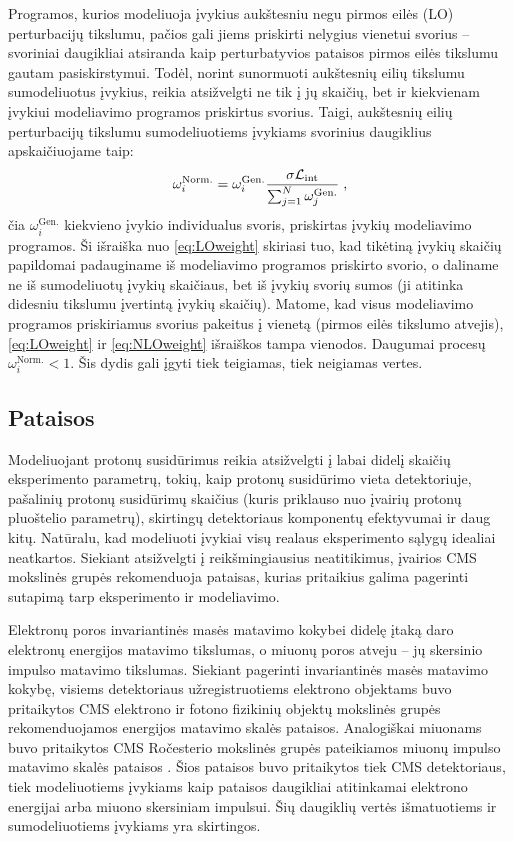 \documentclass[a4paper, 12pt, oneside]{article}
\newcommand{\Lumi}{{\cal L}_\mathrm{int}}
\newlength\q
\begin{document}
Programos, kurios modeliuoja įvykius aukštesniu negu pirmos eilės (LO) perturbacijų tikslumu, pačios gali jiems priskirti
nelygius vienetui svorius -- svoriniai daugikliai atsiranda kaip perturbatyvios pataisos pirmos eilės tikslumu gautam
pasiskirstymui.
Todėl, norint sunormuoti aukštesnių eilių tikslumu sumodeliuotus įvykius, reikia atsižvelgti ne tik į jų skaičių, bet
ir kiekvienam įvykiui modeliavimo programos priskirtus svorius.
Taigi, aukštesnių eilių perturbacijų tikslumu sumodeliuotiems įvykiams svorinius daugiklius apskaičiuojame taip:
\begin{equation}
	\omega_{i}^{\mathrm{Norm.}} = \omega_{i}^{\mathrm{Gen.}} \frac{ \sigma\Lumi }{ \sum_{j=1}^{N}\omega_{j}^{\mathrm{Gen.}} } \; ,
	\label{eq:NLOweight}
\end{equation}
čia $\omega_{i}^{\mathrm{Gen.}}$ kiekvieno įvykio individualus svoris, priskirtas įvykių modeliavimo programos.
Ši išraiška nuo \eqref{eq:LOweight} skiriasi tuo, kad tikėtiną įvykių skaičių papildomai padauginame iš modeliavimo programos
priskirto svorio, o daliname ne iš sumodeliuotų įvykių skaičiaus, bet iš įvykių svorių sumos (ji atitinka didesniu tikslumu
įvertintą įvykių skaičių).
Matome, kad visus modeliavimo programos priskiriamus svorius pakeitus į vienetą (pirmos eilės tikslumo atvejis), \eqref{eq:LOweight}
ir \eqref{eq:NLOweight} išraiškos tampa vienodos.
Daugumai procesų $\omega_{i}^{\mathrm{Norm.}}<1$.
Šis dydis gali įgyti tiek teigiamas, tiek neigiamas vertes.


\subsection{Pataisos}\label{sec:corrections}
Modeliuojant protonų susidūrimus reikia atsižvelgti į labai didelį skaičių eksperimento parametrų, tokių, kaip protonų
susidūrimo vieta detektoriuje, pašalinių protonų susidūrimų skaičius (kuris priklauso nuo įvairių protonų pluoštelio parametrų),
skirtingų detektoriaus komponentų efektyvumai ir daug kitų.
Natūralu, kad modeliuoti įvykiai visų realaus eksperimento sąlygų idealiai neatkartos.
Siekiant atsižvelgti į reikšmingiausius neatitikimus, įvairios CMS mokslinės grupės rekomenduoja pataisas, kurias
pritaikius galima pagerinti sutapimą tarp eksperimento ir modeliavimo.

Elektronų poros invariantinės masės matavimo kokybei didelę įtaką daro elektronų energijos matavimo tikslumas,
o miuonų poros atveju -- jų skersinio impulso matavimo tikslumas.
Siekiant pagerinti invariantinės masės matavimo kokybę, visiems detektoriaus užregistruotiems elektrono objektams
buvo pritaikytos CMS elektrono ir fotono fizikinių objektų mokslinės grupės rekomenduojamos energijos matavimo
skalės pataisos.
Analogiškai miuonams buvo pritaikytos CMS Ročesterio mokslinės grupės pateikiamos miuonų impulso matavimo skalės
pataisos \cite{RocCorr}.
Šios pataisos buvo pritaikytos tiek CMS detektoriaus, tiek modeliuotiems įvykiams kaip pataisos daugikliai atitinkamai
elektrono energijai arba miuono skersiniam impulsui.
Šių daugiklių vertės išmatuotiems ir sumodeliuotiems įvykiams yra skirtingos.
\end{document}
